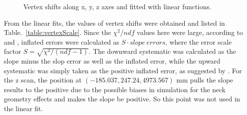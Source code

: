 \begin{figure}
	\centering
	\caption{Vertex shifts along x, y, z axes and fitted with linear functions.}
	\label{fig:vertexScale}
\end{figure}

From the linear fits, the values of vertex shifts were obtained and listed in Table.~\ref{table:vertexScale}. Since the $\chi^2/ndf$ values here were large, according to \cite{waterunidoc} and \cite{pdg2020}, inflated errors were calculated as $S\cdot slope~errors$, where the error scale factor $S=\sqrt{\chi^2/(ndf-1)}$. The downward systematic was calculated as the slope minus the slop error as well as the inflated error, while the upward systematic was simply taken as the positive inflated error, as suggested by \cite{waterunidoc}. For the z scan, the position at $(-185.037,247.24,4973.567)$ mm pulls the slope results to the positive due to the possible biases in simulation for the neck geometry effects and makes the slope be positive. So this point was not used in the linear fit.

